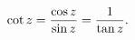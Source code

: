 \[\mathop{\cot\/}\nolimits z=\frac{\mathop{\cos\/}\nolimits z}{\mathop{\sin\/}%
\nolimits z}=\frac{1}{\mathop{\tan\/}\nolimits z}.\]